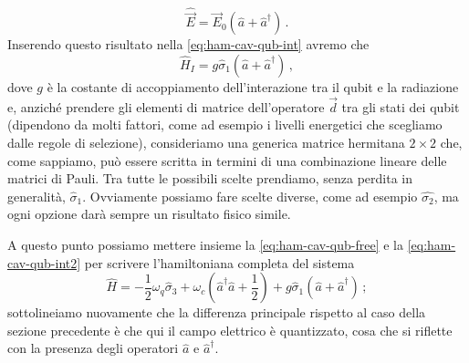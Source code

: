 \begin{equation*}
    \hat{\vec E} = \vec E_0\left(\hat a + \hat a^\dagger\right) \, .
\end{equation*}
Inserendo questo risultato nella \eqref{eq:ham-cav-qub-int} avremo che 
\begin{equation}\label{eq:ham-cav-qub-int2}
    \hat H_I=g\hat\sigma_1\left(\hat a + \hat a^\dagger\right)\, ,
\end{equation}
dove $g$ è la costante di accoppiamento dell'interazione tra il qubit e la radiazione e, anziché prendere gli elementi di matrice dell'operatore $\vec d$ tra gli stati dei qubit (dipendono da molti fattori, come ad esempio i livelli energetici che scegliamo dalle regole di selezione), consideriamo una generica matrice hermitana $2 \times 2$ che, come sappiamo, può essere scritta in termini di una combinazione lineare delle matrici di Pauli. 
Tra tutte le possibili scelte prendiamo, senza perdita in generalità, $\hat \sigma_1$. Ovviamente possiamo fare scelte diverse, come ad esempio $\hat{\sigma_2}$, ma ogni opzione darà sempre un risultato fisico simile.

\noindent A questo punto possiamo mettere insieme la \eqref{eq:ham-cav-qub-free} e la \eqref{eq:ham-cav-qub-int2} per scrivere l'hamiltoniana completa del sistema
\begin{equation}\label{H_da_riscrivere_4}
    \hat H = -\frac 12 \omega_q\hat \sigma_3+\omega_c\left(\hat a^\dagger \hat a +\frac 12\right) + g\hat\sigma_1\left(\hat a + \hat a^\dagger\right) \, ;
\end{equation}
sottolineiamo nuovamente che la differenza principale rispetto al caso della sezione precedente è che qui il campo elettrico è quantizzato, cosa che si riflette con la presenza degli operatori $\hat{a}$ e $\hat{a}^\dag$.

